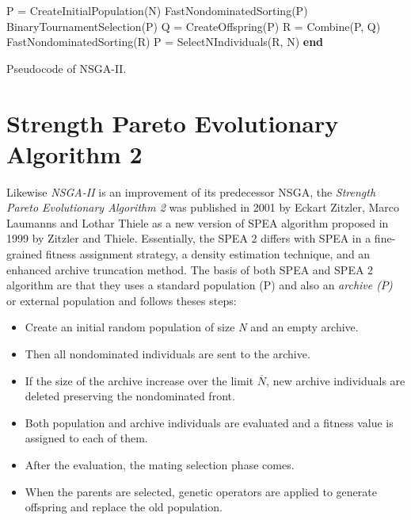 \begin{algorithm}[H]
\begin{algorithmic}[1]
\State P = CreateInitialPopulation(N)\;
\State  FastNondominatedSorting(P)\;
    \State BinaryTournamentSelection(P)\;
    \State Q = CreateOffspring(P)\;
    \State R = Combine(P, Q)\;
    \State FastNondominatedSorting(R)\;
    \State P = SelectNIndividuals(R, N)\;
  \EndWhile
  \State \textbf{end}
\end{algorithmic}
\caption{Pseudocode of NSGA-II.}
\end{algorithm}

\section{Strength Pareto Evolutionary Algorithm 2}
Likewise \textit{NSGA-II} is an improvement of its predecessor NSGA, the \textit{Strength Pareto Evolutionary Algorithm 2} was published in 2001 by Eckart Zitzler, Marco Laumanns and Lothar Thiele as a new version of SPEA algorithm proposed in 1999 by Zitzler and Thiele\cite{SPEA2}. Essentially, the SPEA 2 differs with SPEA in a fine-grained fitness assignment strategy, a density estimation technique, and an enhanced archive truncation method\cite{SPEA2}.
The basis of both SPEA and SPEA 2 algorithm are that they uses a standard population (P) and also an \textit{archive ($\overline{P}$)} or external population and follows theses steps:
\begin{itemize}
    \item Create an initial random population of size \textit{N} and an empty archive.
    \item Then all nondominated individuals are sent to the archive.
    \item If the size of the archive increase over the limit $\overline{N}$, new archive individuals are deleted preserving the nondominated front.
    \item Both population and archive individuals are evaluated and a fitness value is assigned to each of them.
    \item After the evaluation, the mating selection phase comes.
    \item When the parents are selected, genetic operators are applied to generate offspring and replace the old population.
\end{itemize}

